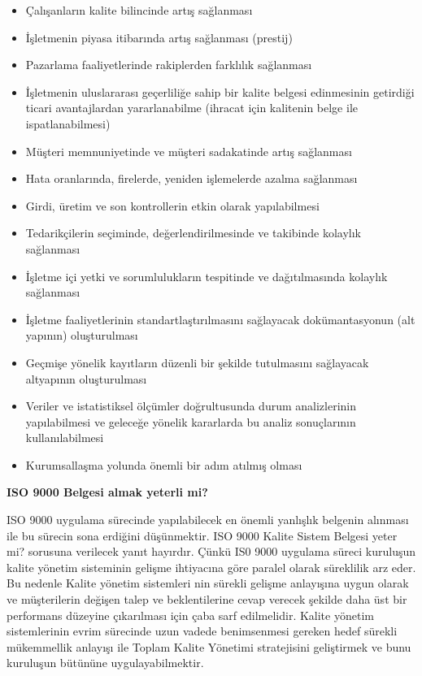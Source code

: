 \documentclass[
]{book}
\providecommand{\tightlist}{%
  \setlength{\itemsep}{0pt}\setlength{\parskip}{0pt}}
\begin{document}
\begin{itemize}
\tightlist
\item
  Çalışanların kalite bilincinde artış sağlanması
\item
  İşletmenin piyasa itibarında artış sağlanması (prestij)
\item
  Pazarlama faaliyetlerinde rakiplerden farklılık sağlanması
\item
  İşletmenin uluslararası geçerliliğe sahip bir kalite belgesi edinmesinin getirdiği ticari avantajlardan yararlanabilme (ihracat için kalitenin belge ile ispatlanabilmesi)
\item
  Müşteri memnuniyetinde ve müşteri sadakatinde artış sağlanması
\item
  Hata oranlarında, firelerde, yeniden işlemelerde azalma sağlanması
\item
  Girdi, üretim ve son kontrollerin etkin olarak yapılabilmesi
\item
  Tedarikçilerin seçiminde, değerlendirilmesinde ve takibinde kolaylık sağlanması
\item
  İşletme içi yetki ve sorumlulukların tespitinde ve dağıtılmasında kolaylık sağlanması
\item
  İşletme faaliyetlerinin standartlaştırılmasını sağlayacak dokümantasyonun (alt yapının) oluşturulması
\item
  Geçmişe yönelik kayıtların düzenli bir şekilde tutulmasını sağlayacak altyapının oluşturulması
\item
  Veriler ve istatistiksel ölçümler doğrultusunda durum analizlerinin yapılabilmesi ve geleceğe yönelik kararlarda bu analiz sonuçlarının kullanılabilmesi
\item
  Kurumsallaşma yolunda önemli bir adım atılmış olması
\end{itemize}

\textbf{ISO 9000 Belgesi almak yeterli mi?}

ISO 9000 uygulama sürecinde yapılabilecek en önemli yanlışlık belgenin alınması ile bu sürecin sona erdiğini düşünmektir. ISO 9000 Kalite Sistem Belgesi yeter mi? sorusuna verilecek yanıt hayırdır. Çünkü IS0 9000 uygulama süreci kuruluşun kalite yönetim sisteminin gelişme ihtiyacına göre paralel olarak süreklilik arz eder. Bu nedenle Kalite yönetim sistemleri nin sürekli gelişme anlayışına uygun olarak ve müşterilerin değişen talep ve beklentilerine cevap verecek şekilde daha üst bir performans düzeyine çıkarılması için çaba sarf edilmelidir. Kalite yönetim sistemlerinin evrim sürecinde uzun vadede benimsenmesi gereken hedef sürekli mükemmellik anlayışı ile Toplam Kalite Yönetimi stratejisini geliştirmek ve bunu kuruluşun bütününe uygulayabilmektir.
\end{document}
